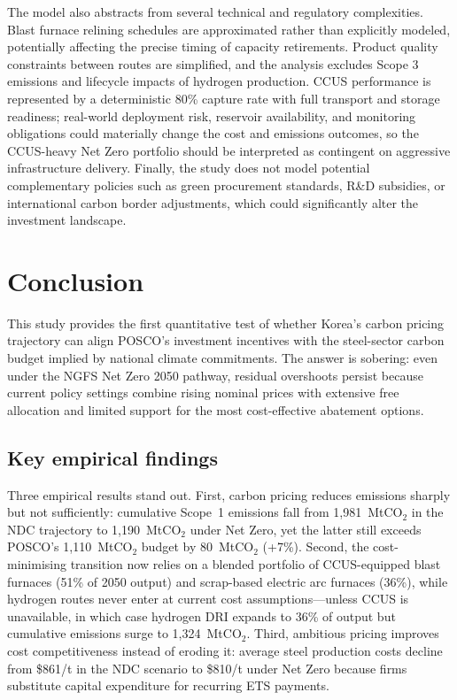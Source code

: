 \documentclass[preprint,1p,authoryear]{elsarticle}
\begin{document}
The model also abstracts from several technical and regulatory complexities. Blast furnace relining schedules are approximated rather than explicitly modeled, potentially affecting the precise timing of capacity retirements. Product quality constraints between routes are simplified, and the analysis excludes Scope 3 emissions and lifecycle impacts of hydrogen production. CCUS performance is represented by a deterministic 80\% capture rate with full transport and storage readiness; real-world deployment risk, reservoir availability, and monitoring obligations could materially change the cost and emissions outcomes, so the CCUS-heavy Net Zero portfolio should be interpreted as contingent on aggressive infrastructure delivery. Finally, the study does not model potential complementary policies such as green procurement standards, R\&D subsidies, or international carbon border adjustments, which could significantly alter the investment landscape.

\section{Conclusion}

This study provides the first quantitative test of whether Korea's carbon pricing trajectory can align POSCO's investment incentives with the steel-sector carbon budget implied by national climate commitments. The answer is sobering: even under the NGFS Net Zero 2050 pathway, residual overshoots persist because current policy settings combine rising nominal prices with extensive free allocation and limited support for the most cost-effective abatement options.

\subsection{Key empirical findings}

Three empirical results stand out. First, carbon pricing reduces emissions sharply but not sufficiently: cumulative Scope~1 emissions fall from 1{,}981~MtCO$_2$ in the NDC trajectory to 1{,}190~MtCO$_2$ under Net Zero, yet the latter still exceeds POSCO's 1{,}110~MtCO$_2$ budget by 80~MtCO$_2$ (+7\%). Second, the cost-minimising transition now relies on a blended portfolio of CCUS-equipped blast furnaces (51\% of 2050 output) and scrap-based electric arc furnaces (36\%), while hydrogen routes never enter at current cost assumptions—unless CCUS is unavailable, in which case hydrogen DRI expands to 36\% of output but cumulative emissions surge to 1{,}324~MtCO$_2$. Third, ambitious pricing improves cost competitiveness instead of eroding it: average steel production costs decline from \$861/t in the NDC scenario to \$810/t under Net Zero because firms substitute capital expenditure for recurring ETS payments.
\end{document}
